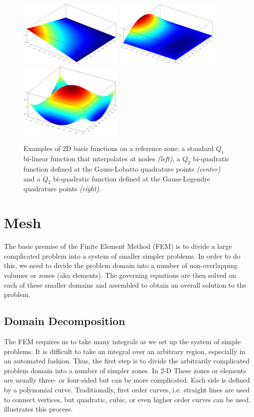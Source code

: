 \begin{figure}[h!]
 \centering
   \centerline{
    \mbox{\includegraphics[width=2.00in]{./Figures/Q1Basis.png}}
    \mbox{\includegraphics[width=2.00in]{./Figures/Q2Basis.png}}
    \mbox{\includegraphics[width=2.00in]{./Figures/Q2dBasis.png}}
  }
 \caption{Examples of 2D basis functions on a reference zone: a standard $Q_1$ bi-linear function that interpolates at nodes \textit{(left)}, a $Q_2$ bi-quadratic function defined at the Gauss-Lobatto quadrature points \textit{(center)} and a $Q_2$ bi-quadratic function defined at the Gauss-Legendre quadrature points \textit{(right)}.}
 \label{fig:ExBasis}
\end{figure}

\section{Mesh}
The basic premise of the Finite Element Method (FEM) is to divide a large complicated problem into a system of smaller simpler problems. In order to do this, we need to divide the problem domain into a number of non-overlapping volumes or zones (aka elements). The governing equations are then solved on each of these smaller domains and assembled to obtain an overall solution to the problem. 

\subsection{Domain Decomposition}
The FEM requires us to take many integrals as we set up the system of simple problems. It is difficult to take an integral over an arbitrary region, especially in an automated fashion. Thus, the first step is to divide the arbitrarily complicated problem domain into a number of simpler zones. In 2-D These zones or elements are usually three- or four-sided but can be more complicated. Each side is defined by a polynomial curve. Traditionally, first order curves, i.e. straight lines are used to connect vertices, but quadratic, cubic, or even higher order curves can be used.  illustrates this process.

